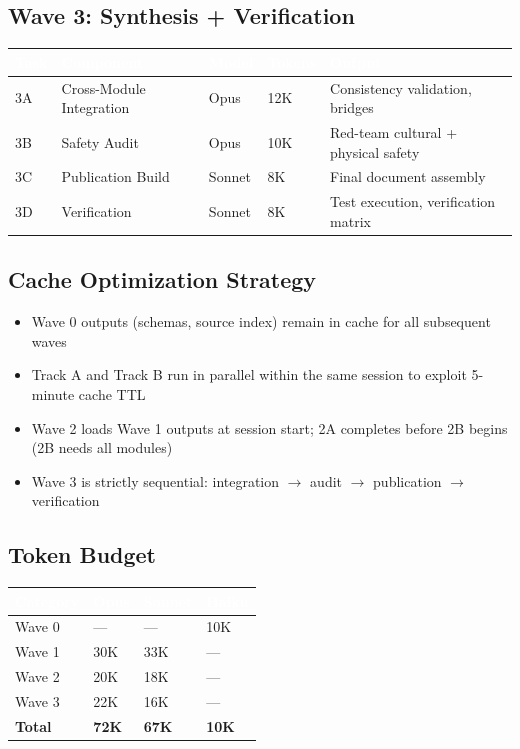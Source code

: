 \documentclass[11pt,letterpaper]{article}
\newcommand{\tableheader}[1]{\textbf{\sffamily\textcolor{white}{#1}}}
\begin{document}
\subsection{Wave 3: Synthesis + Verification}

\begin{center}
\begin{tabularx}{\textwidth}{C{0.8cm}L{3.5cm}C{1.5cm}C{1.5cm}X}
\toprule
{}
\tableheader{Task} & \tableheader{Component} & \tableheader{Model} & \tableheader{Tokens} & \tableheader{Output} \\
\midrule
3A & Cross-Module Integration & Opus & 12K & Consistency validation, bridges \\
3B & Safety Audit & Opus & 10K & Red-team cultural + physical safety \\
3C & Publication Build & Sonnet & 8K & Final document assembly \\
3D & Verification & Sonnet & 8K & Test execution, verification matrix \\
\bottomrule
\end{tabularx}
\end{center}

\subsection{Cache Optimization Strategy}

\begin{itemize}[leftmargin=2em]
\item Wave 0 outputs (schemas, source index) remain in cache for all subsequent waves
\item Track A and Track B run in parallel within the same session to exploit 5-minute cache TTL
\item Wave 2 loads Wave 1 outputs at session start; 2A completes before 2B begins (2B needs all modules)
\item Wave 3 is strictly sequential: integration $\rightarrow$ audit $\rightarrow$ publication $\rightarrow$ verification
\end{itemize}

\subsection{Token Budget}

\begin{center}
\begin{tabularx}{\textwidth}{L{4cm}C{2cm}C{2cm}C{2cm}}
\toprule
{}
\tableheader{Category} & \tableheader{Opus} & \tableheader{Sonnet} & \tableheader{Haiku} \\
\midrule
Wave 0 & --- & --- & 10K \\
Wave 1 & 30K & 33K & --- \\
Wave 2 & 20K & 18K & --- \\
Wave 3 & 22K & 16K & --- \\
\midrule
\textbf{Total} & \textbf{72K} & \textbf{67K} & \textbf{10K} \\
\bottomrule
\end{tabularx}
\end{center}
\end{document}
